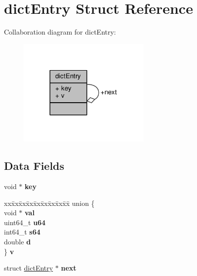\hypertarget{structdictEntry}{}\section{dict\+Entry Struct Reference}
\label{structdictEntry}


Collaboration diagram for dict\+Entry\+:\nopagebreak
\begin{figure}[H]
\begin{center}
\leavevmode
\includegraphics[width=182pt]{structdictEntry__coll__graph}
\end{center}
\end{figure}
\subsection*{Data Fields}
\begin{DoxyCompactItemize}
\item 
\mbox{\label{structdictEntry_a1cc436243330e4ac0a1d7d07e5a16ce0}} 
void $\ast$ {\bfseries key}
\item 
\mbox{\label{structdictEntry_aab34aa7e370a74652ef12d42b96a44d9}} 
\begin{tabbing}
xx\=xx\=xx\=xx\=xx\=xx\=xx\=xx\=xx\=\kill
union \{\\
\mbox{\label{structdictEntry_ae0908b1cf89b6a18ada5063eb2ab1374}} 
void $\ast$ {\bfseries val}\\
\mbox{\label{structdictEntry_aa6c27a4767bc8919f656080b1bf25ed6}} 
uint64\_t {\bfseries u64}\\
\mbox{\label{structdictEntry_a846a60e6c9a0910f0481e5e38f103ebe}} 
int64\_t {\bfseries s64}\\
\mbox{\label{structdictEntry_ad52f3c5c9135b2a55cad243a5599c1d8}} 
double {\bfseries d}\\
\} {\bfseries v}\\

\end{tabbing}\item 
\mbox{\label{structdictEntry_ae3d8892babea304bd7e2aded824586dd}} 
struct \hyperlink{structdictEntry}{dict\+Entry} $\ast$ {\bfseries next}
\end{DoxyCompactItemize}


